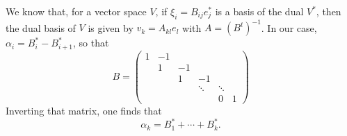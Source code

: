 We know that, for a vector space $V$, if $\xi_i=B_{ij} e^*_j$ is a basis of the dual $V^*$, then the dual basis of $V$ is given by $v_k=A_{kl}e_l$ with $A=(B^t)^{-1}$. In our case, $\alpha_i=B_i^*-B_{i+1}^*$, so that
\begin{equation}
	B =
	\begin{pmatrix}
		1	&	-1\\
		&	1	&	-1\\
		&	&	1	&	-1\\
		&	&	&	\ddots	&\ddots\\
		&	&	&		& 0&1
	\end{pmatrix}
\end{equation}
Inverting that matrix, one finds that
\begin{equation}
	\alpha_k = B_1^*+\cdots+B_k^*.
\end{equation}

